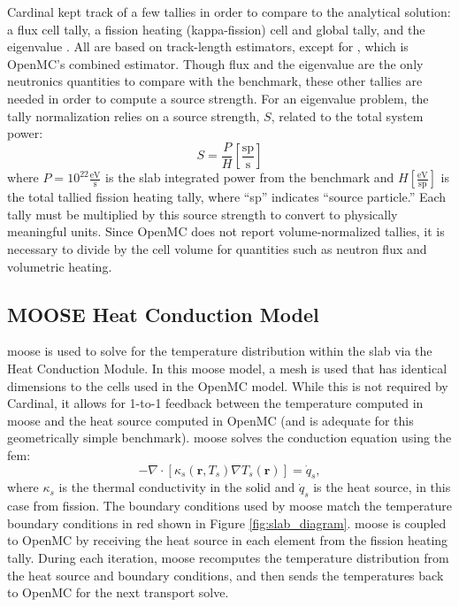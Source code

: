 \documentclass[letterpaper]{mc2023}
\begin{document}
Cardinal kept track of a few tallies in order to compare to the analytical solution: a flux cell tally, a fission heating (kappa-fission)
cell and global tally, and the eigenvalue \keff. All are based on track-length estimators, except for \keff, which is OpenMC's combined
estimator. Though flux and the eigenvalue are the only neutronics quantities to compare with the benchmark, these other tallies are needed
in order to compute a source strength. For an eigenvalue problem, the tally normalization relies on a source strength, $S$, related to the
total system power:
\begin{equation} \label{eq:source_strength}
   S = \frac{P}{H} \left[\frac{\textrm{sp}}{\textrm{s}} \right]
\end{equation}
where $P=10^{22} \frac{\textrm{eV}}{\textrm{s}}$ is the slab integrated power from the benchmark and $H \left[\frac{\textrm{eV}}{\textrm{sp}} \right]$
is the total tallied fission heating tally, where ``sp'' indicates ``source particle.'' Each tally must be multiplied by this source strength to
convert to physically meaningful units. Since OpenMC does not report volume-normalized tallies, it is necessary to divide by the cell volume
for quantities such as neutron flux and volumetric heating.

\subsection{MOOSE Heat Conduction Model}
\gls{moose} is used to solve for the temperature distribution within the slab via the Heat Conduction Module. In this \gls{moose}
model, a mesh is used that has identical dimensions to the cells used in the OpenMC model. While this is not required by Cardinal,
it allows for 1-to-1 feedback between the temperature computed in \gls{moose} and the heat source computed in OpenMC (and is
adequate for this geometrically simple benchmark). \gls{moose} solves the conduction equation using the \gls{fem}:
\begin{equation}\label{eq:conduction}
    - \nabla \cdot [\kappa_{s}(\mathbf{r},T_{s}) \nabla T_{s}(\mathbf{r})] = \dot{q}_{s},
\end{equation}
where $\kappa_{s}$ is the thermal conductivity in the solid and $\dot{q}_{s}$ is the heat source, in this case from fission. The
boundary conditions used by \gls{moose} match the temperature boundary conditions in red shown in Figure \ref{fig:slab_diagram}.
\gls{moose} is coupled to OpenMC by receiving the heat source in each element from the fission heating tally. During each iteration,
\gls{moose} recomputes the temperature distribution from the heat source and boundary conditions, and then sends the temperatures
back to OpenMC for the next transport solve.
\end{document}
